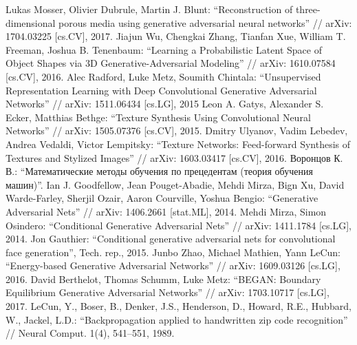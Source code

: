 \documentclass[a4paper]{article}
\begin{document}
	
	\setcounter{page}{2}
	\tableofcontents
	
	
	
	
	
	
	
	\clearpage
	\begin{thebibliography}{99}
		 Lukas Mosser, Olivier Dubrule, Martin J. Blunt: ``Reconstruction of three-dimensional porous media using generative adversarial neural networks'' // arXiv: 1704.03225 [cs.CV], 2017.
		 Jiajun Wu, Chengkai Zhang, Tianfan Xue, William T. Freeman, Joshua B. Tenenbaum: ``Learning a Probabilistic Latent Space of Object Shapes via 3D Generative-Adversarial Modeling'' // arXiv: 1610.07584 [cs.CV], 2016.
		 Alec Radford, Luke Metz, Soumith Chintala: ``Unsupervised Representation Learning with Deep Convolutional Generative Adversarial Networks'' // arXiv: 1511.06434 [cs.LG], 2015
		 Leon A. Gatys, Alexander S. Ecker, Matthias Bethge: ``Texture Synthesis Using Convolutional Neural Networks'' // arXiv: 1505.07376 [cs.CV], 2015.
		 Dmitry Ulyanov, Vadim Lebedev, Andrea Vedaldi, Victor Lempitsky: ``Texture Networks: Feed-forward Synthesis of Textures and Stylized Images'' // arXiv: 1603.03417 [cs.CV], 2016.
		  Воронцов К. В.: ``Математические методы обучения по прецедентам (теория обучения машин)''.
		 Ian J. Goodfellow, Jean Pouget-Abadie, Mehdi Mirza, Bign Xu, David Warde-Farley, Sherjil Ozair, Aaron Courville, Yoshua Bengio: ``Generative Adversarial Nets'' // arXiv: 1406.2661 [stat.ML], 2014.
		 Mehdi Mirza, Simon Osindero: ``Conditional Generative Adversarial Nets'' // arXiv: 1411.1784 [cs.LG], 2014.
		 Jon Gauthier: ``Conditional generative adversarial nets for convolutional face generation'', Tech. rep., 2015.
		 Junbo Zhao, Michael Mathien, Yann LeCun: ``Energy-based Generative Adversarial Networks'' // arXiv: 1609.03126 [cs.LG], 2016.
		 David Berthelot, Thomas Schumm, Luke Metz: ``BEGAN: Boundary Equilibrium Generative Adversarial Networks'' // arXiv: 1703.10717 [cs.LG], 2017.
		 LeCun, Y., Boser, B., Denker, J.S., Henderson, D., Howard, R.E., Hubbard, W., Jackel, L.D.: ``Backpropagation applied to handwritten zip code recognition'' // Neural Comput. 1(4), 541–551, 1989.

\end{thebibliography}
\end{document}
